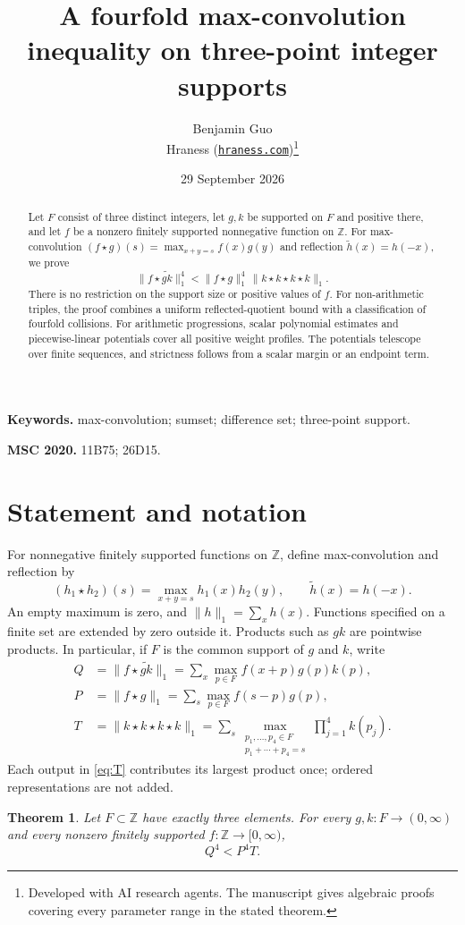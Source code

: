 \documentclass[11pt,a4paper]{article}
\title{A fourfold max-convolution inequality on three-point integer supports}
\author{Benjamin Guo\\Hraness (\href{https://hraness.com}{\texttt{hraness.com}})\thanks{Developed with AI research agents. The manuscript gives algebraic proofs covering every parameter range in the stated theorem.}}
\date{29 September 2026}
\newtheorem{theorem}{Theorem}
\theoremstyle{remark}
\newcommand{\Z}{\mathbb Z}
\newcommand{\mc}{\star}
\begin{document}
\maketitle
\begin{abstract}
Let $F$ consist of three distinct integers, let $g,k$ be supported on $F$ and positive there,
and let $f$ be a nonzero finitely supported nonnegative function on $\Z$.
For max-convolution $(f\mc g)(s)=\max_{x+y=s}f(x)g(y)$ and reflection
$\widetilde h(x)=h(-x)$, we prove
\[
 \|f\mc\widetilde{gk}\|_1^4
 <\|f\mc g\|_1^4\,\|k\mc k\mc k\mc k\|_1.
\]
There is no restriction on the support size or positive values of $f$.
For non-arithmetic triples, the proof combines a uniform reflected-quotient
bound with a classification of fourfold collisions. For arithmetic
progressions, scalar polynomial estimates and piecewise-linear potentials
cover all positive weight profiles. The potentials telescope over finite
sequences, and strictness follows from a scalar margin or an endpoint term.
\end{abstract}
\medskip\noindent\textbf{Keywords.} max-convolution; sumset; difference set; three-point support.
\par\noindent\textbf{MSC 2020.} 11B75; 26D15.

\section{Statement and notation}

For nonnegative finitely supported functions on $\Z$, define
max-convolution and reflection by
\[
 (h_1\mc h_2)(s)=\max_{x+y=s}h_1(x)h_2(y),
 \qquad \widetilde h(x)=h(-x).
\]
An empty maximum is zero, and $\|h\|_1=\sum_x h(x)$.
Functions specified on a finite set are extended by zero outside it.
Products such as $gk$ are pointwise products. In particular, if $F$ is
the common support of $g$ and $k$, write
\begin{align}
 Q&=\|f\mc\widetilde{gk}\|_1
   =\sum_x\max_{p\in F}f(x+p)g(p)k(p),\label{eq:Q}\\
 P&=\|f\mc g\|_1
   =\sum_s\max_{p\in F}f(s-p)g(p),\label{eq:P}\\
 T&=\|k\mc k\mc k\mc k\|_1
   =\sum_s\max_{\substack{p_1,\ldots,p_4\in F\\p_1+\cdots+p_4=s}}
       \prod_{j=1}^4 k(p_j).\label{eq:T}
\end{align}
Each output in \eqref{eq:T} contributes its largest product once;
ordered representations are not added.

\begin{theorem}\label{thm:main}
Let $F\subset\Z$ have exactly three elements. For every $g,k:F\to(0,\infty)$
and every nonzero finitely supported $f:\Z\to[0,\infty)$,
\begin{equation}\label{eq:main}
 Q^4<P^4T.
\end{equation}
\end{theorem}
\end{document}
